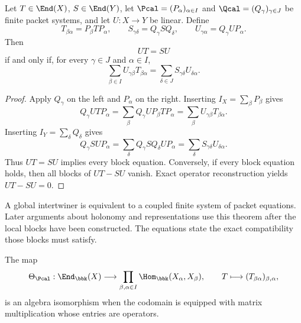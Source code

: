 \begin{theorem}
\label{thm:block-intertwining}
Let \(T\in\End(X)\), \(S\in\End(Y)\), let \(\Pcal=(P_\alpha)_{\alpha\in I}\) and \(\Qcal=(Q_\gamma)_{\gamma\in J}\) be finite packet systems, and let \(U:X\to Y\) be linear.  Define
\[
T_{\beta\alpha}=P_\beta TP_\alpha,
\qquad
S_{\gamma\delta}=Q_\gamma SQ_\delta,
\qquad
U_{\gamma\alpha}=Q_\gamma UP_\alpha.
\]
Then
\[
\boxed{UT=SU}
\]
if and only if, for every \(\gamma\in J\) and \(\alpha\in I\),
\[
\boxed{
\sum_{\beta\in I}U_{\gamma\beta}T_{\beta\alpha}
=
\sum_{\delta\in J}S_{\gamma\delta}U_{\delta\alpha}.
}
\]
\end{theorem}

\begin{proof}
Apply \(Q_\gamma\) on the left and \(P_\alpha\) on the right.  Inserting \(I_X=\sum_\beta P_\beta\) gives
\[
Q_\gamma UTP_\alpha
=
\sum_\beta Q_\gamma UP_\beta TP_\alpha
=
\sum_\beta U_{\gamma\beta}T_{\beta\alpha}.
\]
Inserting \(I_Y=\sum_\delta Q_\delta\) gives
\[
Q_\gamma SUP_\alpha
=
\sum_\delta Q_\gamma SQ_\delta UP_\alpha
=
\sum_\delta S_{\gamma\delta}U_{\delta\alpha}.
\]
Thus \(UT=SU\) implies every block equation.  Conversely, if every block equation holds, then all blocks of \(UT-SU\) vanish.  Exact operator reconstruction yields \(UT-SU=0\).
\end{proof}

\begin{interpretation}
A global intertwiner is equivalent to a coupled finite system of packet equations.  Later arguments about holonomy and representations use this theorem after the local blocks have been constructed.  The equations state the exact compatibility those blocks must satisfy.
\end{interpretation}


\begin{theorem}
\label{thm:block-algebra}
The map
\[
\Theta_{\Pcal}:\End_{\bbk}(X)
\longrightarrow
\prod_{\beta,\alpha\in I}\Hom_{\bbk}(X_\alpha,X_\beta),
\qquad
T\longmapsto(T_{\beta\alpha})_{\beta,\alpha},
\]
is an algebra isomorphism when the codomain is equipped with matrix multiplication whose entries are operators.
\end{theorem}

